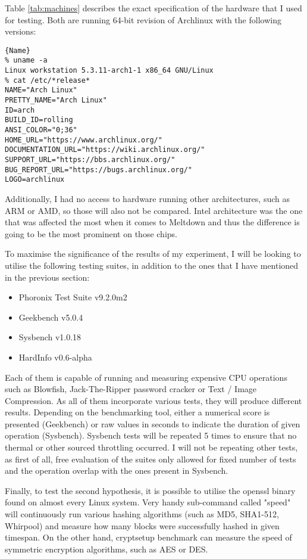 \documentclass{csfourzero}
\begin{document}
Table \ref{tab:machines} describes the exact specification of the hardware that I used for testing. Both are running 64-bit revision of Archlinux with the following versions: 

\begin{lstlisting}[frame=tlrb, basicstyle=\small]{Name}
% uname -a
Linux workstation 5.3.11-arch1-1 x86_64 GNU/Linux
% cat /etc/*release*
NAME="Arch Linux"
PRETTY_NAME="Arch Linux"
ID=arch
BUILD_ID=rolling
ANSI_COLOR="0;36"
HOME_URL="https://www.archlinux.org/"
DOCUMENTATION_URL="https://wiki.archlinux.org/"
SUPPORT_URL="https://bbs.archlinux.org/"
BUG_REPORT_URL="https://bugs.archlinux.org/"
LOGO=archlinux
\end{lstlisting}

Additionally, I had no access to hardware running other architectures, such as ARM or AMD, so those will also not be compared. Intel architecture was the one that was affected the most when it comes to Meltdown and thus the difference is going to be the most prominent on those chips.

To maximise the significance of the results of my experiment, I will be looking to utilise the following testing suites, in addition to the ones that I have mentioned in the previous section:
\begin{itemize}
  \item Phoronix Test Suite v9.2.0m2
  \item Geekbench v5.0.4
  \item Sysbench v1.0.18
  \item HardInfo v0.6-alpha
\end{itemize}
Each of them is capable of running and measuring expensive CPU operations such as Blowfish, Jack-The-Ripper password cracker or Text / Image Compression. As all of them incorporate various tests, they will produce different results. Depending on the benchmarking tool, either a numerical score is presented (Geekbench) or raw values in seconds to indicate the duration of given operation (Sysbench). Sysbench tests will be repeated 5 times to ensure that no thermal or other sourced throttling occurred. I will not be repeating other tests, as first of all, free evaluation of the suites only allowed for fixed number of tests and the operation overlap with the ones present in Sysbench. 

Finally, to test the second hypothesis, it is possible to utilise the openssl binary found on almost every Linux system. Very handy sub-command called "speed" will continuously run various hashing algorithms (such as MD5, SHA1-512, Whirpool) and measure how many blocks were successfully hashed in given timespan. On the other hand, cryptsetup benchmark can measure the speed of symmetric encryption algorithms, such as AES or DES. 
\end{document}
